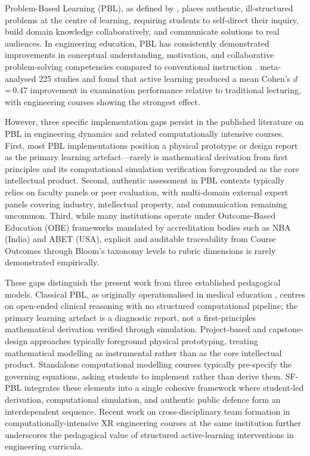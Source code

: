 \documentclass[utf8]{FrontiersinHarvard}
\begin{document}
Problem-Based Learning (PBL), as defined by \citet{hmelo2004problem}, places
authentic, ill-structured problems at the centre of learning, requiring
students to self-direct their inquiry, build domain knowledge collaboratively,
and communicate solutions to real audiences. In engineering education, PBL
has consistently demonstrated improvements in conceptual understanding,
motivation, and collaborative problem-solving competencies compared to
conventional instruction \citep{prince2006inductive, dym2005engineering,
dochy2003effects}. \citet{freeman2014active} meta-analysed 225 studies and
found that active learning produced a mean Cohen's $d$\,=\,0.47 improvement
in examination performance relative to traditional lecturing, with
engineering courses showing the strongest effect.

However, three specific implementation gaps persist in the published
literature on PBL in engineering dynamics and related computationally
intensive courses. First, most PBL implementations position a physical
prototype or design report as the primary learning artefact---rarely is
mathematical derivation from first principles and its computational
simulation verification foregrounded as the core intellectual product.
Second, authentic assessment in PBL contexts typically relies on faculty
panels or peer evaluation, with multi-domain external expert panels
covering industry, intellectual property, and communication remaining
uncommon. Third, while many institutions operate under Outcome-Based
Education (OBE) frameworks mandated by accreditation bodies such as
NBA (India) and ABET (USA), explicit and auditable traceability from
Course Outcomes through Bloom's taxonomy levels to rubric dimensions
is rarely demonstrated empirically.

These gaps distinguish the present work from three established pedagogical
models. Classical PBL, as originally operationalised in medical education
\citep{hmelo2004problem}, centres on open-ended clinical reasoning with no
structured computational pipeline; the primary learning artefact is a
diagnostic report, not a first-principles mathematical derivation verified
through simulation. Project-based and capstone-design approaches
\citep{dym2005engineering} typically foreground physical prototyping, treating
mathematical modelling as instrumental rather than as the core intellectual
product. Standalone computational modelling courses
\citep{justo2021enhancing} typically pre-specify the governing equations,
asking students to implement rather than derive them. SF-PBL integrates
these elements into a single cohesive framework where student-led
derivation, computational simulation, and authentic public defence form an
interdependent sequence. Recent work on cross-disciplinary team formation in
computationally-intensive XR engineering courses at the same institution
\citep{nanade2026cross} further underscores the pedagogical value of
structured active-learning interventions in engineering curricula.
\end{document}
